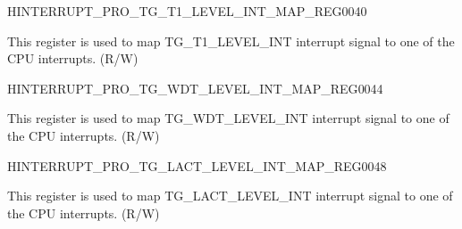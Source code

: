 \begin{register}{H}{INTERRUPT\_PRO\_TG\_T1\_LEVEL\_INT\_MAP\_REG}{\hexprefix{}0040}\label{regdesc:INTERRUPTPROTGT1LEVELINTMAPREG}
%
%
\regnewline%
\begin{regdesc}\begin{reglist}
\label{fielddesc:INTERRUPTPROTGT1LEVELINTMAP}\item [INTERRUPT\_PRO\_TG\_T1\_LEVEL\_INT\_MAP] This register is used to map TG\_T1\_LEVEL\_INT interrupt signal to one of the CPU interrupts. (R/W)
\end{reglist}\end{regdesc}
\end{register}


\begin{register}{H}{INTERRUPT\_PRO\_TG\_WDT\_LEVEL\_INT\_MAP\_REG}{\hexprefix{}0044}\label{regdesc:INTERRUPTPROTGWDTLEVELINTMAPREG}
%
%
\regnewline%
\begin{regdesc}\begin{reglist}
\label{fielddesc:INTERRUPTPROTGWDTLEVELINTMAP}\item [INTERRUPT\_PRO\_TG\_WDT\_LEVEL\_INT\_MAP] This register is used to map TG\_WDT\_LEVEL\_INT interrupt signal to one of the CPU interrupts. (R/W)
\end{reglist}\end{regdesc}
\end{register}


\begin{register}{H}{INTERRUPT\_PRO\_TG\_LACT\_LEVEL\_INT\_MAP\_REG}{\hexprefix{}0048}\label{regdesc:INTERRUPTPROTGLACTLEVELINTMAPREG}
%
%
\regnewline%
\begin{regdesc}\begin{reglist}
\label{fielddesc:INTERRUPTPROTGLACTLEVELINTMAP}\item [INTERRUPT\_PRO\_TG\_LACT\_LEVEL\_INT\_MAP] This register is used to map TG\_LACT\_LEVEL\_INT interrupt signal to one of the CPU interrupts. (R/W)
\end{reglist}\end{regdesc}
\end{register}



